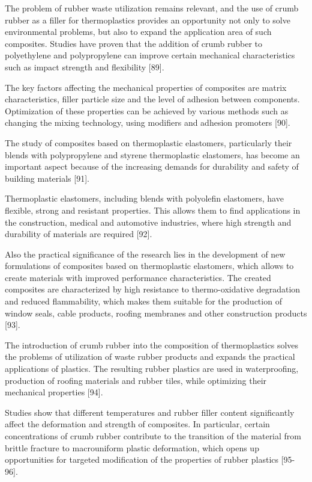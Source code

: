 \begin{multicols}{2}
The problem of rubber waste utilization remains relevant, and the use of
crumb rubber as a filler for thermoplastics provides an opportunity not
only to solve environmental problems, but also to expand the application
area of such composites. Studies have proven that the addition of crumb
rubber to polyethylene and polypropylene can improve certain mechanical
characteristics such as impact strength and flexibility {[}89{]}.

The key factors affecting the mechanical properties of composites are
matrix characteristics, filler particle size and the level of adhesion
between components. Optimization of these properties can be achieved by
various methods such as changing the mixing technology, using modifiers
and adhesion promoters {[}90{]}.

The study of composites based on thermoplastic elastomers, particularly
their blends with polypropylene and styrene thermoplastic elastomers,
has become an important aspect because of the increasing demands for
durability and safety of building materials {[}91{]}.

Thermoplastic elastomers, including blends with polyolefin elastomers,
have flexible, strong and resistant properties. This allows them to find
applications in the construction, medical and automotive industries,
where high strength and durability of materials are required {[}92{]}.

Also the practical significance of the research lies in the development
of new formulations of composites based on thermoplastic elastomers,
which allows to create materials with improved performance
characteristics. The created composites are characterized by high
resistance to thermo-oxidative degradation and reduced flammability,
which makes them suitable for the production of window seals, cable
products, roofing membranes and other construction products {[}93{]}.

The introduction of crumb rubber into the composition of thermoplastics
solves the problems of utilization of waste rubber products and expands
the practical applications of plastics. The resulting rubber plastics
are used in waterproofing, production of roofing materials and rubber
tiles, while optimizing their mechanical properties {[}94{]}.

Studies show that different temperatures and rubber filler content
significantly affect the deformation and strength of composites. In
particular, certain concentrations of crumb rubber contribute to the
transition of the material from brittle fracture to macrouniform plastic
deformation, which opens up opportunities for targeted modification of
the properties of rubber plastics {[}95-96{]}.


\end{multicols}
